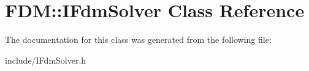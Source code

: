 \hypertarget{class_f_d_m_1_1_i_fdm_solver}{}\section{F\+D\+M\+:\+:I\+Fdm\+Solver Class Reference}
\label{class_f_d_m_1_1_i_fdm_solver}


The documentation for this class was generated from the following file\+:\begin{DoxyCompactItemize}
\item 
include/I\+Fdm\+Solver.\+h\end{DoxyCompactItemize}
